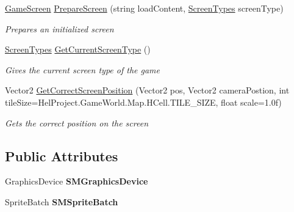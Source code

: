 \begin{DoxyCompactItemize}
\hyperlink{class_hel_project_1_1_u_i_1_1_game_screen}{Game\+Screen} \hyperlink{class_hel_project_1_1_u_i_1_1_screen_manager_a61f086a7ce24b6c365d09c5a0d4f74bb}{Prepare\+Screen} (string load\+Content, \hyperlink{class_hel_project_1_1_u_i_1_1_screen_manager_af86dcb0d11cec6ce52f50e9b98798175}{Screen\+Types} screen\+Type)
\begin{DoxyCompactList}\small\item\em Prepares an initialized screen \end{DoxyCompactList}\item 
\hyperlink{class_hel_project_1_1_u_i_1_1_screen_manager_af86dcb0d11cec6ce52f50e9b98798175}{Screen\+Types} \hyperlink{class_hel_project_1_1_u_i_1_1_screen_manager_a7c9a1573412a1177692cfff5302a63cc}{Get\+Current\+Screen\+Type} ()
\begin{DoxyCompactList}\small\item\em Gives the current screen type of the game \end{DoxyCompactList}\item 
Vector2 \hyperlink{class_hel_project_1_1_u_i_1_1_screen_manager_adcd226de04d0359300cdd2bc8dd32968}{Get\+Correct\+Screen\+Position} (Vector2 pos, Vector2 camera\+Postion, int tile\+Size=Hel\+Project.\+Game\+World.\+Map.\+H\+Cell.\+T\+I\+L\+E\+\_\+\+S\+I\+Z\+E, float scale=1.\+0f)
\begin{DoxyCompactList}\small\item\em Gets the correct position on the screen \end{DoxyCompactList}\end{DoxyCompactItemize}
\subsection*{Public Attributes}
\begin{DoxyCompactItemize}
\item 
\hypertarget{class_hel_project_1_1_u_i_1_1_screen_manager_a3d4d17256df969e1b5627c3112cf4415}{}Graphics\+Device {\bfseries S\+M\+Graphics\+Device}\label{class_hel_project_1_1_u_i_1_1_screen_manager_a3d4d17256df969e1b5627c3112cf4415}

\item 
\hypertarget{class_hel_project_1_1_u_i_1_1_screen_manager_abebd23e127c1340fbb916fa14cf5b1a4}{}Sprite\+Batch {\bfseries S\+M\+Sprite\+Batch}\label{class_hel_project_1_1_u_i_1_1_screen_manager_abebd23e127c1340fbb916fa14cf5b1a4}

\end{DoxyCompactItemize}
